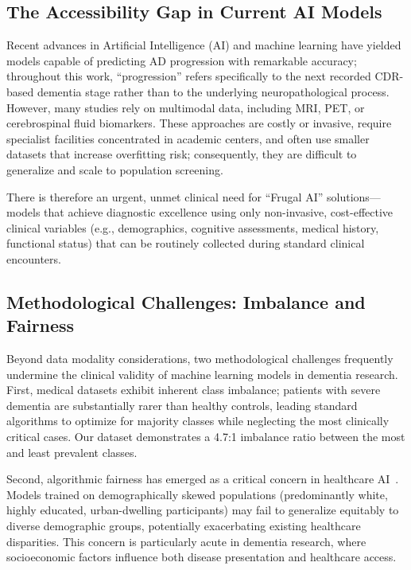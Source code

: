 \documentclass[preprint,12pt]{elsarticle}
\begin{document}
\subsection{The Accessibility Gap in Current AI Models}

Recent advances in Artificial Intelligence (AI) and machine learning have yielded models capable of predicting AD progression with remarkable accuracy; throughout this work, ``progression'' refers specifically to the next recorded CDR-based dementia stage rather than to the underlying neuropathological process. However, many studies rely on multimodal data, including MRI, PET, or cerebrospinal fluid biomarkers. These approaches are costly or invasive, require specialist facilities concentrated in academic centers, and often use smaller datasets that increase overfitting risk; consequently, they are difficult to generalize and scale to population screening.

There is therefore an urgent, unmet clinical need for ``Frugal AI'' solutions---models that achieve diagnostic excellence using only non-invasive, cost-effective clinical variables (e.g., demographics, cognitive assessments, medical history, functional status) that can be routinely collected during standard clinical encounters.

\subsection{Methodological Challenges: Imbalance and Fairness}

Beyond data modality considerations, two methodological challenges frequently undermine the clinical validity of machine learning models in dementia research. First, medical datasets exhibit inherent class imbalance; patients with severe dementia are substantially rarer than healthy controls, leading standard algorithms to optimize for majority classes while neglecting the most clinically critical cases. Our dataset demonstrates a 4.7:1 imbalance ratio between the most and least prevalent classes.

Second, algorithmic fairness has emerged as a critical concern in healthcare AI~\cite{obermeyer2019,rajkomar2018,gianfrancesco2018}. Models trained on demographically skewed populations (predominantly white, highly educated, urban-dwelling participants) may fail to generalize equitably to diverse demographic groups, potentially exacerbating existing healthcare disparities. This concern is particularly acute in dementia research, where socioeconomic factors influence both disease presentation and healthcare access.
\end{document}
